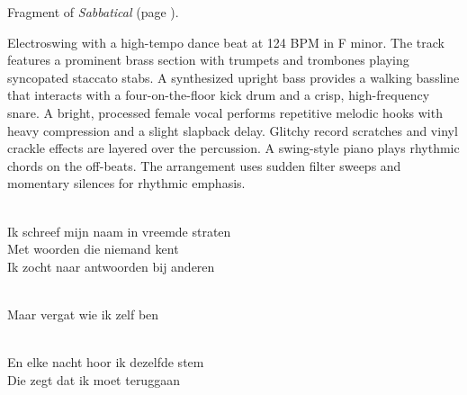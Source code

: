 
\begin{notes}
Fragment of \emph{Sabbatical} (page \pageref{sec:sabbatical}).\\
\end{notes}
\begin{style}
Electroswing with a high-tempo dance beat at 124 BPM in F minor. The track features a prominent brass section with trumpets and trombones playing syncopated staccato stabs. A synthesized upright bass provides a walking bassline that interacts with a four-on-the-floor kick drum and a crisp, high-frequency snare. A bright, processed female vocal performs repetitive melodic hooks with heavy compression and a slight slapback delay. Glitchy record scratches and vinyl crackle effects are layered over the percussion. A swing-style piano plays rhythmic chords on the off-beats. The arrangement uses sudden filter sweeps and momentary silences for rhythmic emphasis.
\end{style}
\begin{lyrics}
\\
Ik schreef mijn naam in vreemde straten
\\
Met woorden die niemand kent
\\
Ik zocht naar antwoorden bij anderen

\\
Maar vergat wie ik zelf ben

\\
En elke nacht hoor ik dezelfde stem\\
Die zegt dat ik moet teruggaan
\end{lyrics}

